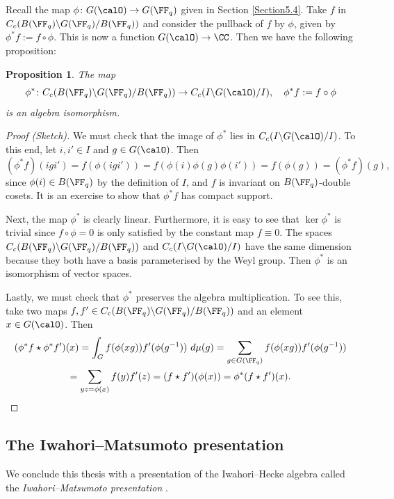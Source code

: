 \documentclass[11pt]{amsart}
\newtheorem{prop}[thm]{Proposition}
\theoremstyle{remark}
\begin{document}
Recall the map $\phi\colon G(\calO)\to G(\FF_q)$ given in Section \ref{Section5.4}.
Take $f$ in $C_c(B(\FF_q)\backslash G(\FF_q)/B(\FF_q))$ and consider the pullback of $f$ by $\phi$, given by $\phi^\ast f := f\circ \phi$.
This is now a function $G(\calO)\to\CC$.
Then we have the following proposition:
\begin{prop}
	The map
	\[
		\phi^\ast\colon C_c(B(\FF_q)\backslash G(\FF_q)/B(\FF_q))\to C_c(I\backslash G(\calO)/I), \quad \phi^\ast f := f\circ \phi
	\]
	is an algebra isomorphism.
\end{prop}
\begin{proof}[Proof (Sketch)]
	We must check that the image of $\phi^\ast$ lies in $C_c(I\backslash G(\calO)/I)$.
	To this end, let $i,i'\in I$ and $g\in G(\calO)$.
	Then
	\[
		(\phi^\ast f)(igi') = f(\phi(igi')) = f(\phi(i)\phi(g)\phi(i')) = f(\phi(g))=(\phi^\ast f)(g),
	\]
	since $\phi(i)\in B(\FF_q)$ by the definition of $I$, and $f$ is invariant on $B(\FF_q)$-double cosets.
	It is an exercise to show that $\phi^\ast f$ has compact support.

	Next, the map $\phi^\ast$ is clearly linear.
	Furthermore, it is easy to see that $\ker \phi^\ast$ is trivial since $f\circ \phi=0$ is only satisfied by the constant map $f\equiv 0$.
	The spaces $C_c(B(\FF_q)\backslash G(\FF_q)/B(\FF_q))$ and $C_c(I\backslash G(\calO)/I)$ have the same dimension because they both have a basis parameterised by the Weyl group.
	Then $\phi^\ast$ is an isomorphism of vector spaces.

	Lastly, we must check that $\phi^\ast$ preserves the algebra multiplication.
	To see this, take two maps $f,f'\in C_c(B(\FF_q)\backslash G(\FF_q)/B(\FF_q))$ and an element $x\in G(\calO)$.
	Then
	\begin{multline*}
		(\phi^\ast f \star \phi^\ast f')(x) = \int_G f(\phi(xg))f'(\phi(g^{-1}))\ d\mu(g) = \sum_{g\in G(\FF_q)} f(\phi(xg))f'(\phi(g^{-1})) \\
		= \sum_{yz=\phi(x)} f(y)f'(z) = (f\star f')(\phi(x)) = \phi^\ast(f\star f')(x). \qedhere
	\end{multline*}
\end{proof}


\subsection{The Iwahori--Matsumoto presentation}
We conclude this thesis with a presentation of the Iwahori--Hecke algebra called the \emph{Iwahori--Matsumoto presentation} \cite{HP02, Solleveld21, Prasad05, Bump10}.
\end{document}
